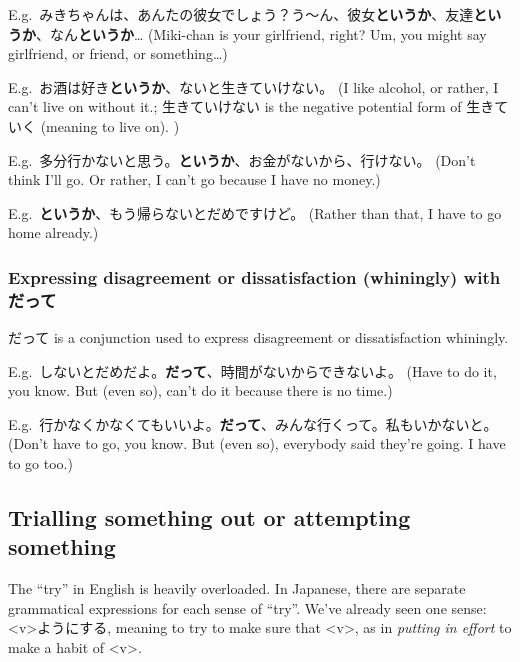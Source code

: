 \documentclass[../nihongo-gakushuu-kyouzai.tex]{subfiles}
\begin{document}
E.g.\ みきちゃんは、あんたの彼女でしょう？う〜ん、彼女\textbf{というか}、友達\textbf{というか}、なん\textbf{というか}\dots{} (Miki-chan is your girlfriend, right? Um, you might say girlfriend, or friend, or something\dots)

E.g.\ お酒は好き\textbf{というか}、ないと生きていけない。 (I like alcohol, or rather, I can't live on without it.; 生きていけない is the negative potential form of 生きていく (meaning to live on).  )

E.g.\ 多分行かないと思う。\textbf{というか}、お金がないから、行けない。 (Don't think I'll go. Or rather, I can't go because I have no money.)

E.g.\ \textbf{というか}、もう帰らないとだめですけど。 (Rather than that, I have to go home already.)

\subsubsection{Expressing disagreement or dissatisfaction (whiningly) with だって}
だって is a conjunction used to express disagreement or dissatisfaction whiningly.

E.g.\ しないとだめだよ。\textbf{だって}、時間がないからできないよ。 (Have to do it, you know. But (even so), can't do it because there is no time.)

E.g.\ 行かなくかなくてもいいよ。\textbf{だって}、みんな行くって。私もいかないと。 (Don't have to go, you know. But (even so), everybody said they're going. I have to go too.)

\subsection{Trialling something out or attempting something} \label{sec:trialling-something-out-or-attempting-something}
The ``try'' in English is heavily overloaded. In Japanese, there are separate grammatical expressions for each sense of ``try''. We've already seen one sense: <v>ようにする, meaning to try to make sure that <v>, as in \emph{putting in effort} to make a habit of <v>.
\end{document}
